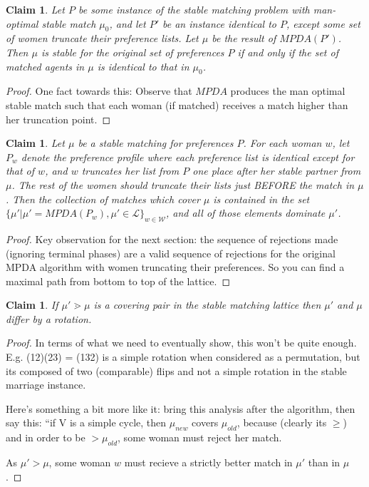 \documentclass[12pt]{article}
\newcommand{\W}{\mathcal{W}}
\renewcommand{\L}{\mathcal{L}}
\newtheorem{claim}[definition]{Claim}
\begin{document}
  \begin{claim}
    Let $P$ be some instance of the stable matching problem
    with man-optimal stable match $\mu_0$, and let
    $P'$ be an instance identical to $P$, except some set of women truncate
    their preference lists. Let $\mu$ be the result of $MPDA(P')$.
    Then $\mu$ is stable for the original set of preferences $P$ if and only if
    the set of matched agents in $\mu$ is identical to that in $\mu_0$.
  \end{claim}
  \begin{proof}
    One fact towards this:
    Observe that $MPDA$ produces the man optimal stable match such that each
    woman (if matched) receives a match higher than her truncation point.
  \end{proof}
  \begin{claim}
    Let $\mu$ be a stable matching for preferences $P$.
    For each woman $w$, let $P_w$ denote the preference profile where each
    preference list is identical except for that of $w$,
    and $w$ truncates her list from $P$ one place after her stable partner from
    $\mu$. The rest of the women should truncate their lists
    just BEFORE the match in $\mu$.
    Then the collection of matches which cover $\mu$
    is contained in the set $\{\mu' | \mu' = MPDA(P_w), 
    \mu'\in\L \}_{w\in\W}$, and all of those elements dominate $\mu'$.
  \end{claim}
  \begin{proof}

    Key observation for the next section: the sequence of rejections made
    (ignoring terminal phases) are a valid sequence of rejections for the
    original MPDA algorithm with women truncating their preferences.
    So you can find a maximal path from bottom to top of the lattice.
  \end{proof}
  \begin{claim}
    If $\mu' \gtrdot \mu$ is a covering pair in the stable matching lattice
    then $\mu'$ and $\mu$ differ by a rotation.
  \end{claim}
  \begin{proof}
    In terms of what we need to eventually show, this won't be quite enough.
    E.g. (12)(23) = (132) is a simple rotation when considered as a permutation,
    but its composed of two (comparable) flips and not a simple rotation in the
    stable marriage instance.

    Here's something a bit more like it: bring this analysis after the
    algorithm, then say this: ``if V is a simple cycle, then $\mu_{new}$
    covers $\mu_{old}$, because (clearly its $\ge$) and in order to be
    $>\mu_{old}$, some woman must reject her match.

    As $\mu' > \mu$, some woman $w$ must recieve a strictly better match in
    $\mu'$ than in $\mu$.
  \end{proof}
\end{document}
